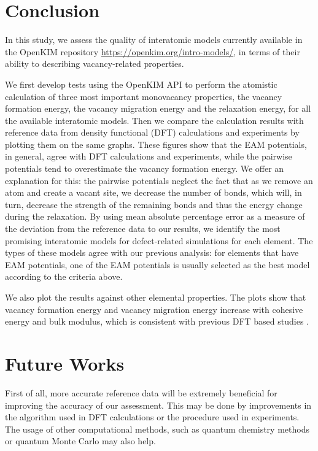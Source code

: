 \documentclass[%
 reprint,
 amsmath,amssymb,
 aps,
]{revtex4-1}
\begin{document}
\section{\label{sec:conclusion}Conclusion}

In this study, we assess the quality of interatomic models currently available in the OpenKIM repository \url{https://openkim.org/intro-models/}, in terms of their ability to describing vacancy-related properties.

We first develop tests using the OpenKIM API to perform the atomistic calculation of three most important monovacancy properties, the vacancy formation energy, the vacancy migration energy and the relaxation energy, for all the available interatomic models.
Then we compare the calculation results with reference data from density functional (DFT) calculations and experiments by plotting them on the same graphs.
These figures show that the EAM potentials, in general, agree with DFT calculations and experiments, while the pairwise potentials tend to overestimate the vacancy formation energy.
We offer an explanation for this: the pairwise potentials neglect the fact that as we remove an atom and create a vacant site, we decrease the number of bonds, which will, in turn, decrease the strength of the remaining bonds and thus the energy change during the relaxation.
By using mean absolute percentage error as a measure of the deviation from the reference data to our results, we identify the most promising interatomic models for defect-related simulations for each element.
The types of these models agree with our previous analysis: for elements that have EAM potentials, one of the EAM potentials is usually selected as the best model according to the criteria above.

We also plot the results against other elemental properties.
The plots show that vacancy formation energy and vacancy migration energy increase with cohesive energy and bulk modulus, which is consistent with previous DFT based studies \cite{angsten2014elemental}.

\section{\label{sec:conclusion}Future Works}

First of all, more accurate reference data will be extremely beneficial for improving the accuracy of our assessment.
This may be done by improvements in the algorithm used in DFT calculations or the procedure used in experiments.
The usage of other computational methods, such as quantum chemistry methods or quantum Monte Carlo may also help.
\end{document}
